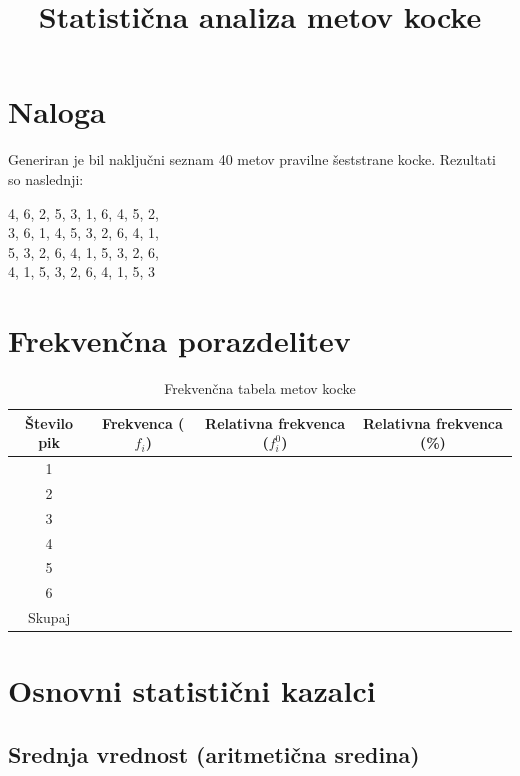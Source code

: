 \documentclass[12pt,a4paper]{article}
\title{Statistična analiza metov kocke}
\author{}
\date{}
\begin{document}
\maketitle

\section{Naloga}

Generiran je bil naključni seznam 40 metov pravilne šeststrane kocke. Rezultati so naslednji:

\begin{center}
4, 6, 2, 5, 3, 1, 6, 4, 5, 2, \\
3, 6, 1, 4, 5, 3, 2, 6, 4, 1, \\
5, 3, 2, 6, 4, 1, 5, 3, 2, 6, \\
4, 1, 5, 3, 2, 6, 4, 1, 5, 3
\end{center}

\section{Frekvenčna porazdelitev}

\begin{table}[h]
\centering
\caption{Frekvenčna tabela metov kocke}
\begin{tabular}{cccc}
\toprule
Število pik & Frekvenca ($f_i$) & Relativna frekvenca ($f_i^0$) & Relativna frekvenca (\%)\\
\midrule
1 &  & \phantom{0.15} & \phantom{0.15} \\
2 &  &  & \phantom{0.15} \\
3 &  &  &  \\
4 &  &  & \\
5 &  &  & \\
6 &  &  &  \\
\midrule
Skupaj &  &  &   \\
\bottomrule
\end{tabular}
\end{table}

\section{Osnovni statistični kazalci}

\subsection{Srednja vrednost (aritmetična sredina)}
\end{document}
